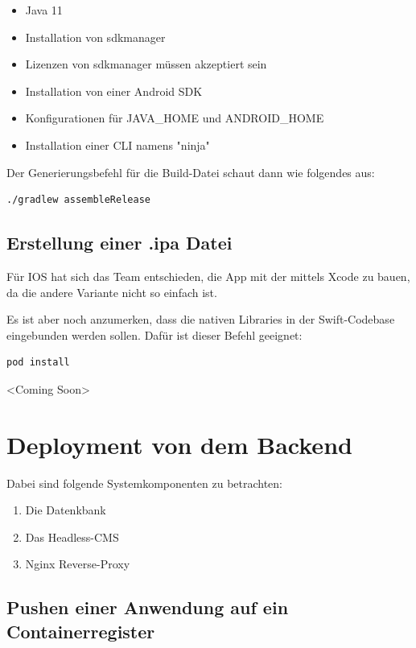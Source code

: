 \begin{itemize}
  \item Java 11
  \item Installation von sdkmanager
  \item Lizenzen von sdkmanager müssen akzeptiert sein
  \item Installation von einer Android SDK
  \item Konfigurationen für JAVA\_HOME und ANDROID\_HOME
  \item Installation einer CLI namens "ninja"
\end{itemize}

Der Generierungsbefehl für die Build-Datei schaut dann wie folgendes aus:

\begin{lstlisting}[language=bash,caption=generate apk]
./gradlew assembleRelease
\end{lstlisting}



\subsection{Erstellung einer .ipa Datei}
Für IOS hat sich das Team entschieden, die App mit der mittels Xcode zu bauen, da die andere Variante nicht so einfach ist.


Es ist aber noch anzumerken, dass die nativen Libraries in der  Swift-Codebase eingebunden werden sollen.
Dafür ist dieser Befehl geeignet:
\begin{lstlisting}[language=bash, caption=bind ios libraries]
pod install
\end{lstlisting}


<Coming Soon>

\section{Deployment von dem Backend}


Dabei sind folgende Systemkomponenten zu betrachten:

\begin{enumerate}
  \item Die Datenkbank
  \item  Das Headless-CMS
  \item Nginx Reverse-Proxy
\end{enumerate}


\subsection{Pushen einer Anwendung auf ein Containerregister}

